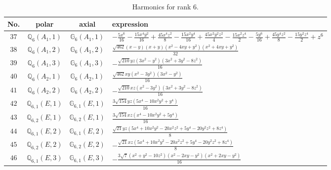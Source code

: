 \documentclass[fleqn,8pt,landscape]{jsarticle}
\begin{document}
\begin{table}[ht!]
\begin{center}
\caption{Harmonics for rank 6.}
\renewcommand{\arraystretch}{1.3}
\begin{tabular}{cccl} \hline \hline
No. & polar & axial & expression \\ \hline
$ 37 $ & $ \mathbb{Q}_{6}(A_{1},1) $ & $ \mathbb{G}_{6}(A_{1},1) $ & $ - \frac{5 x^{6}}{16} - \frac{15 x^{4} y^{2}}{16} + \frac{45 x^{4} z^{2}}{8} - \frac{15 x^{2} y^{4}}{16} + \frac{45 x^{2} y^{2} z^{2}}{4} - \frac{15 x^{2} z^{4}}{2} - \frac{5 y^{6}}{16} + \frac{45 y^{4} z^{2}}{8} - \frac{15 y^{2} z^{4}}{2} + z^{6} $ \\
$ 38 $ & $ \mathbb{Q}_{6}(A_{1},2) $ & $ \mathbb{G}_{6}(A_{1},2) $ & $ \frac{\sqrt{462} \left(x - y\right) \left(x + y\right) \left(x^{2} - 4 x y + y^{2}\right) \left(x^{2} + 4 x y + y^{2}\right)}{32} $ \\
$ 39 $ & $ \mathbb{Q}_{6}(A_{1},3) $ & $ \mathbb{G}_{6}(A_{1},3) $ & $ - \frac{\sqrt{210} y z \left(3 x^{2} - y^{2}\right) \left(3 x^{2} + 3 y^{2} - 8 z^{2}\right)}{16} $ \\
$ 40 $ & $ \mathbb{Q}_{6}(A_{2},1) $ & $ \mathbb{G}_{6}(A_{2},1) $ & $ \frac{\sqrt{462} x y \left(x^{2} - 3 y^{2}\right) \left(3 x^{2} - y^{2}\right)}{16} $ \\
$ 41 $ & $ \mathbb{Q}_{6}(A_{2},2) $ & $ \mathbb{G}_{6}(A_{2},2) $ & $ - \frac{\sqrt{210} x z \left(x^{2} - 3 y^{2}\right) \left(3 x^{2} + 3 y^{2} - 8 z^{2}\right)}{16} $ \\
$ 42 $ & $ \mathbb{Q}_{6,1}(E,1) $ & $ \mathbb{G}_{6,1}(E,1) $ & $ \frac{3 \sqrt{154} y z \left(5 x^{4} - 10 x^{2} y^{2} + y^{4}\right)}{16} $ \\
$ 43 $ & $ \mathbb{Q}_{6,2}(E,1) $ & $ \mathbb{G}_{6,2}(E,1) $ & $ \frac{3 \sqrt{154} x z \left(x^{4} - 10 x^{2} y^{2} + 5 y^{4}\right)}{16} $ \\
$ 44 $ & $ \mathbb{Q}_{6,1}(E,2) $ & $ \mathbb{G}_{6,1}(E,2) $ & $ \frac{\sqrt{21} y z \left(5 x^{4} + 10 x^{2} y^{2} - 20 x^{2} z^{2} + 5 y^{4} - 20 y^{2} z^{2} + 8 z^{4}\right)}{8} $ \\
$ 45 $ & $ \mathbb{Q}_{6,2}(E,2) $ & $ \mathbb{G}_{6,2}(E,2) $ & $ - \frac{\sqrt{21} x z \left(5 x^{4} + 10 x^{2} y^{2} - 20 x^{2} z^{2} + 5 y^{4} - 20 y^{2} z^{2} + 8 z^{4}\right)}{8} $ \\
$ 46 $ & $ \mathbb{Q}_{6,1}(E,3) $ & $ \mathbb{G}_{6,1}(E,3) $ & $ - \frac{3 \sqrt{7} \left(x^{2} + y^{2} - 10 z^{2}\right) \left(x^{2} - 2 x y - y^{2}\right) \left(x^{2} + 2 x y - y^{2}\right)}{16} $ \\

\end{tabular}
\end{center}
\end{table}
\end{document}
